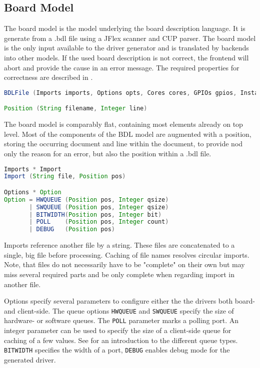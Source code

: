 \documentclass{report}
\begin{document}
\subsection{Board Model}
The board model is the model underlying the board description language. It is generate from a .bdl file using a JFlex scanner and CUP parser. The board model is the only input available to the driver generator and is translated by backends into other models. If the used board description is not correct, the frontend will abort and provide the cause in an error message. The required properties for correctness are described in .

\begin{lstlisting}[language=java, breaklines=true]
BDLFile (Imports imports, Options opts, Cores cores, GPIOs gpios, Instances insts, Medium medium, Scheduler scheduler)

Position (String filename, Integer line)
\end{lstlisting}

The board model is comparably flat, containing most elements already on top level. Most of the components of the BDL model are augmented with a position, storing the occurring document and line within the document, to provide nod only the reason for an error, but also the position within a .bdl file.

\begin{lstlisting}[language=java, breaklines=true]
Imports * Import
Import (String file, Position pos)

Options * Option
Option = HWQUEUE (Position pos, Integer qsize)
       | SWQUEUE (Position pos, Integer qsize)
       | BITWIDTH(Position pos, Integer bit)
       | POLL    (Position pos, Integer count)
       | DEBUG   (Position pos)
\end{lstlisting}

Imports reference another file by a string. These files are concatenated to a single, big file before processing. Caching of file names resolves circular imports. Note, that files do not necessarily have to be "complete" on their own but may miss several required parts and be only complete when regarding import in another file.

Options specify several parameters to configure either the the drivers both board- and client-side. The queue options \texttt{HWQUEUE} and \texttt{SWQUEUE} specify the size of hardware- or software queues. The \texttt{POLL} parameter marks a polling port. An integer parameter can be used to specify the size of a client-side queue for caching of a few values. See  for an introduction to the different queue types.
\texttt{BITWIDTH} specifies the width of a port, \texttt{DEBUG} enables debug mode for the generated driver.
\end{document}
